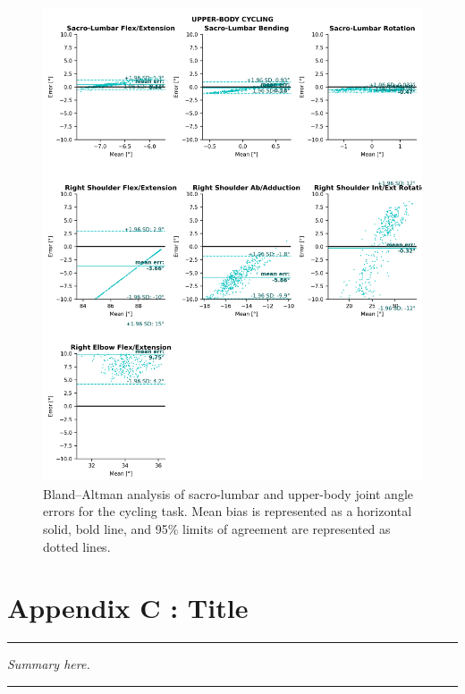 \begin{figure}[!ht]
	\centering
	\def\svgwidth{1\columnwidth}
	\fontsize{10pt}{10pt}\selectfont
	\includegraphics[height=\dimexpr\textheight-119pt]{"../Annexes/Figures/Fig_BlandBikeUp.png"}
	\caption{Bland–Altman analysis of sacro-lumbar and upper-body joint angle errors for the cycling task. Mean bias is represented as a horizontal solid, bold line, and 95\% limits of agreement are represented as dotted lines.}
	\label{fig_blandbikeup}
\end{figure}


\FloatBarrier
\chapter{Appendix C : Title}
\label{Ann:3}


\begin{center}
\rule{0.7\linewidth}{.5pt}
\begin{minipage}{0.7\linewidth}
\smallskip

\textit{Summary here.
}

\end{minipage}
\smallskip
\rule{0.7\linewidth}{.5pt}
\end{center}

